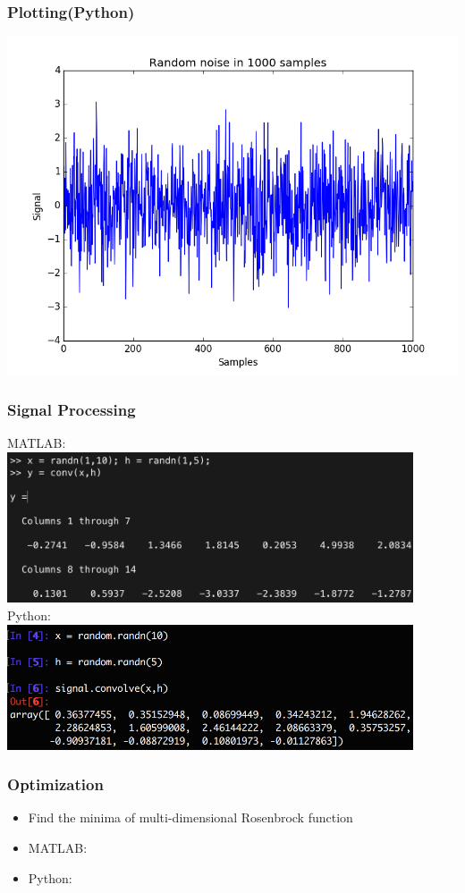 \documentclass[compress]{beamer}
\begin{document}
\begin{frame}
	\frametitle{Plotting(Python)}
	\centering
	\includegraphics[width=\textwidth]{fig/python_plot}
\end{frame}

\begin{frame}
	\frametitle{Signal Processing}
	\centering
	MATLAB:\\
	\includegraphics[width=0.9\textwidth]{fig/matlab_sp}\\
	Python:\\
	\includegraphics[width=0.9\textwidth]{fig/python_sp}	
\end{frame}

\begin{frame}
	\frametitle{Optimization}
	\begin{itemize}
		\item Find the minima of multi-dimensional Rosenbrock function
		\item MATLAB:
		
		\item Python:
		
	\end{itemize}
\end{frame}
\end{document}
